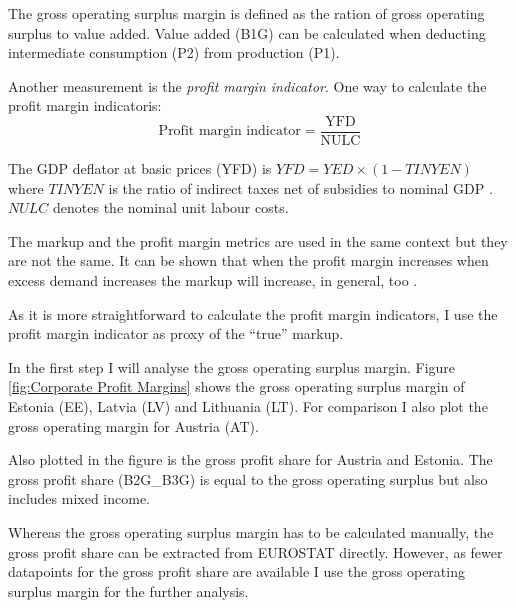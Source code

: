 \documentclass[twoside]{article}
\begin{document}
\begin{multicols}{2}
The gross operating surplus margin is defined as the ration of gross operating surplus to value added. Value added (B1G) can be calculated when deducting intermediate consumption (P2) from production (P1). 

Another measurement is the \textit{profit margin indicator}. One way to calculate the profit margin indicator\footnotemark is: 
\begin{equation}
\text{Profit margin indicator} = \frac{\text{YFD}}{\text{NULC}}
\end{equation}

The GDP deflator at basic prices (YFD) is $YFD = YED \times (1-TINYEN)$ where $TINYEN$ is the ratio of indirect taxes net of subsidies to nominal GDP \citep{Kramer2010Methodological}. $NULC$ denotes the nominal unit labour costs. 



The markup and the profit margin metrics are used in the same context but they are not the same. It can be shown that when the profit margin increases when excess demand increases the markup will increase, in general, too \citep{Macallan2008How}. 

As it is more straightforward to calculate the profit margin indicators, I use the profit margin indicator as proxy of the ``true'' markup. 


In the first step I will analyse the gross operating surplus margin. Figure \ref{fig:Corporate Profit Margins} shows the gross operating surplus margin of Estonia (EE), Latvia (LV) and Lithuania (LT). For comparison I also plot the gross operating margin for Austria (AT).

Also plotted in the figure is the gross profit share for Austria and Estonia. The gross profit share (B2G\_B3G) is equal to the gross operating surplus but also includes mixed income\footnotemark. 

Whereas the gross operating surplus margin has to be calculated manually, the gross profit share can be extracted from EUROSTAT directly. However, as fewer datapoints for the gross profit share are available I use the gross operating surplus margin for the further analysis. 



\end{multicols}
\end{document}
